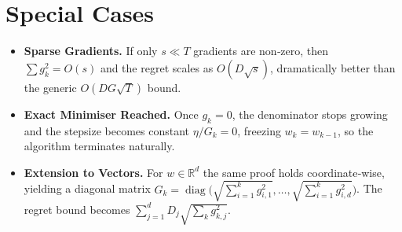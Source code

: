 \documentclass{article}
\begin{document}
\section*{Special Cases}
\begin{itemize}
\item \textbf{Sparse Gradients.} If only $s\ll T$ gradients are non‑zero,
then $\sum g_{k}^{2}=O(s)$ and the regret scales as $O(D\sqrt{s})$, dramatically
better than the generic $O(DG\sqrt{T})$ bound.
\item \textbf{Exact Minimiser Reached.} Once $g_{k}=0$, the denominator stops
growing and the stepsize becomes constant $\eta/G_{k}=0$, freezing $w_{k}=w_{k-1}$,
so the algorithm terminates naturally.
\item \textbf{Extension to Vectors.} For $w\in\mathbb{R}^{d}$ the same proof
holds coordinate‑wise, yielding a diagonal matrix $G_{k}=\operatorname{diag}
\bigl(\sqrt{\sum_{i=1}^{k}g_{i,1}^{2}},\dots,\sqrt{\sum_{i=1}^{k}g_{i,d}^{2}}\bigr)$.
The regret bound becomes $\sum_{j=1}^{d}D_{j}\sqrt{\sum_{k}g_{k,j}^{2}}$.
\end{itemize}
\end{document}
